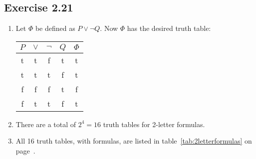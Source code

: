 \documentclass[leqno]{article}
\begin{document}
\subsection*{Exercise 2.21}
\begin{enumerate}
  \item
  Let $\Phi$ be defined as $P \lor \neg Q$. Now $\Phi$ has the desired truth table:
  \begin{center}
    \begin{tabular}{cccc|c}
      \hline
      $P$ & $\lor$ & $\neg$ & $Q$ & $\Phi$ \\
      \hline
       t  &    t   &    f   &  t  &    t   \\
       t  &    t   &    t   &  f  &    t   \\
       f  &    f   &    f   &  t  &    f   \\
       f  &    t   &    t   &  f  &    t   \\
      \hline
    \end{tabular}
  \end{center}

  \item
  There are a total of $2^4 = 16$ truth tables for 2-letter formulas.

  \item
  All 16 truth tables, with formulas, are listed in table~\ref{tab:2letterformulas} on page~\pageref{tab:2letterformulas}.


\end{enumerate}
\end{document}
